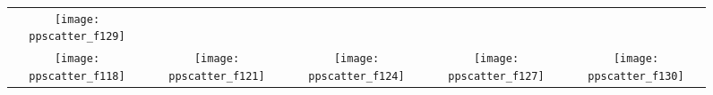 \documentclass{article}
\newcommand{\ERT}{\ensuremath{\mathrm{ERT}}}
\newcommand{\algorithmA}{ALG0-acronym}  %
\newcommand{\algorithmB}{ALG1-acronym}   %
\begin{document}
\begin{figure}
\begin{tabular}{*{5}{@{}c@{}}}
    \texttt{[image: ppscatter\_f129]}\\
    \texttt{[image: ppscatter\_f118]}&
    \texttt{[image: ppscatter\_f121]}&
    \texttt{[image: ppscatter\_f124]}&
    \texttt{[image: ppscatter\_f127]}&
    \texttt{[image: ppscatter\_f130]}
\end{tabular}
\caption{\label{fig:scatterplots}
}
\end{figure}
\end{document}
